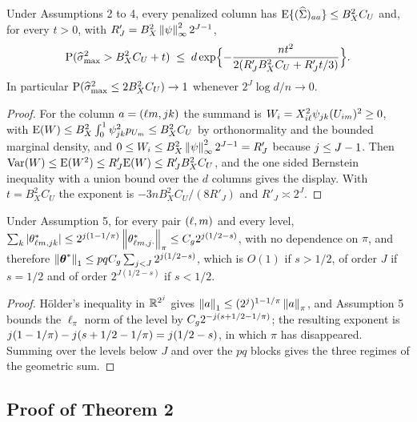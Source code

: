 \begin{lemma}
\label{lem:columns}
Under Assumptions 2 to 4, every penalized column has
$\mathrm{E}\{(\widehat{\Sigma})_{aa}\} \le B_X^2C_U$ and, for every $t>0$, with
$R'_J = B_X^2\left\lVert \psi \right\rVert^2_{\infty}2^{J-1}$,
\[
  \mathrm{P}(\widehat{\sigma}_{\max}^2 > B_X^2C_U+t) \;\le\;
  d\exp\Bigl\{-\frac{nt^2}{2(R'_JB_X^2C_U+R'_Jt/3)}\Bigr\} .
\]
In particular $\mathrm{P}(\widehat{\sigma}_{\max}^2 \le 2B_X^2C_U) \to 1$ whenever
$2^J\log d/n \to 0$.
\end{lemma}

\begin{proof}
For the column $a = (\ell m,jk)$ the summand is
$W_i = X_{i\ell}^2\psi_{jk}(U_{im})^2 \ge 0$, with
$\mathrm{E}(W) \le B_X^2\int_0^1\psi_{jk}^2p_{U_{m}} \le B_X^2C_U$ by
orthonormality and the bounded marginal density, and
$0 \le W_i \le B_X^2\left\lVert \psi \right\rVert_{\infty}^22^{J-1} = R'_J$ because
$j \le J-1$. Then $\mathrm{Var}(W) \le \mathrm{E}(W^2) \le R'_J\mathrm{E}(W) \le R'_JB_X^2C_U$, and
the one sided Bernstein inequality with a union bound over the $d$ columns
gives the display. With $t = B_X^2C_U$ the exponent is
$-3nB_X^2C_U/(8R'_J)$ and $R'_J \asymp 2^J$.
\end{proof}

\begin{lemma}
\label{lem:l1}
Under Assumption 5, for every pair $(\ell,m)$ and every level,
$\sum_{k}|\theta^{*}_{\ell m,jk}| \le
2^{j(1-1/\pi)}\left\lVert \theta^{*}_{\ell m,j\cdot} \right\rVert_{\pi} \le
C_g2^{j(1/2-s)}$, with no dependence on $\pi$, and therefore
$\left\lVert \boldsymbol{\theta}^{*} \right\rVert_1 \le pqC_g\sum_{j<J}2^{j(1/2-s)}$, which is
$O(1)$ if $s>1/2$, of order $J$ if $s = 1/2$ and of order
$2^{J(1/2-s)}$ if $s<1/2$.
\end{lemma}

\begin{proof}
Hölder's inequality in $\mathbb{R}^{2^{j}}$ gives
$\left\lVert a \right\rVert_1 \le (2^{j})^{1-1/\pi}\left\lVert a \right\rVert_{\pi}$, and Assumption 5 bounds
the $\ell_\pi$ norm of the level by $C_g2^{-j(s+1/2-1/\pi)}$; the resulting
exponent is $j(1-1/\pi)-j(s+1/2-1/\pi) = j(1/2-s)$, in which $\pi$
has disappeared. Summing over the levels below $J$ and over the $pq$ blocks
gives the three regimes of the geometric sum.
\end{proof}


\subsection*{Proof of Theorem 2}

